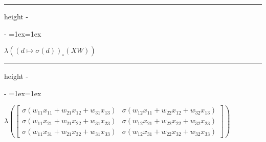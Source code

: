 \documentclass[letterpaper,10pt,english]{sphinxmanual}
\makeatletter
\newenvironment{nbsphinxfancyoutput}{%
    \let\sphinxincludegraphics\nbsphinxincludegraphics
    \nbsphinx@image@maxheight\textheight
    \advance\nbsphinx@image@maxheight -2\fboxsep   %
    \advance\nbsphinx@image@maxheight -2\fboxrule  %
    \advance\nbsphinx@image@maxheight -\baselineskip
\def\nbsphinxfcolorbox{\spx@fcolorbox{nbsphinx-code-border}{white}}%
\def\FrameCommand{\nbsphinxfcolorbox\nbsphinxfancyaddprompt\@empty}%
\def\FirstFrameCommand{\nbsphinxfcolorbox\nbsphinxfancyaddprompt\sphinxVerbatim@Continues}%
\def\MidFrameCommand{\nbsphinxfcolorbox\sphinxVerbatim@Continued\sphinxVerbatim@Continues}%
\def\LastFrameCommand{\nbsphinxfcolorbox\sphinxVerbatim@Continued\@empty}%
\MakeFramed{\advance\hsize-\width\@totalleftmargin\z@\linewidth\hsize\@setminipage}%
\lineskip=1ex\lineskiplimit=1ex\raggedright%
}{\par\unskip\@minipagefalse\endMakeFramed}
\def\nbsphinxfancyaddprompt{\ifvoid\nbsphinxpromptbox\else
    \kern\fboxrule\kern\fboxsep
    \copy\nbsphinxpromptbox
    \kern-\ht\nbsphinxpromptbox\kern-\dp\nbsphinxpromptbox
    \kern-\fboxsep\kern-\fboxrule\nointerlineskip
    \fi}
\newlength\nbsphinxcodecellspacing
\newcommand*{\nbsphinxincludegraphics}[2][]{%
    \gdef\spx@includegraphics@options{#1}%
    \setbox\spx@image@box\hbox{\texttt{[image: \#2]}}%
    \in@false
    \ifdim \wd\spx@image@box>\linewidth
      \g@addto@macro\spx@includegraphics@options{,width=\linewidth}%
      \in@true
    \fi
    \ifdim \ht\spx@image@box>\nbsphinx@image@maxheight
      \g@addto@macro\spx@includegraphics@options{,height=\nbsphinx@image@maxheight}%
      \in@true
    \fi
    \ifin@
      \g@addto@macro\spx@includegraphics@options{,keepaspectratio}%
    \fi
    \setbox\spx@image@box\box\voidb@x %
    \expandafter\includegraphics\expandafter[\spx@includegraphics@options]{#2}%
}%
\makeatother
\begin{document}
{
\begin{sphinxVerbatim}[commandchars=\\\{\}]
\llap{\color{nbsphinxin}[65]:\,\hspace{\fboxrule}\hspace{\fboxsep}}
  
\end{sphinxVerbatim}
}

\hrule height -\fboxrule\relax
\vspace{\nbsphinxcodecellspacing}

\savebox\nbsphinxpromptbox[0pt][r]{\color{nbsphinxout}\Verb|\strut{[65]:}\,|}

\begin{nbsphinxfancyoutput}
$\displaystyle \lambda{\left({\left( d \mapsto \sigma{\left(d \right)} \right)}_{\circ}\left({X W}\right) \right)}$
\end{nbsphinxfancyoutput}

{
\begin{sphinxVerbatim}[commandchars=\\\{\}]
\llap{\color{nbsphinxin}[66]:\,\hspace{\fboxrule}\hspace{\fboxsep}}   
\end{sphinxVerbatim}
}

\hrule height -\fboxrule\relax
\vspace{\nbsphinxcodecellspacing}

\savebox\nbsphinxpromptbox[0pt][r]{\color{nbsphinxout}\Verb|\strut{[66]:}\,|}

\begin{nbsphinxfancyoutput}
$\displaystyle \lambda{\left(\left[\begin{matrix}\sigma{\left(w_{11} x_{11} + w_{21} x_{12} + w_{31} x_{13} \right)} & \sigma{\left(w_{12} x_{11} + w_{22} x_{12} + w_{32} x_{13} \right)}\\\sigma{\left(w_{11} x_{21} + w_{21} x_{22} + w_{31} x_{23} \right)} & \sigma{\left(w_{12} x_{21} + w_{22} x_{22} + w_{32} x_{23} \right)}\\\sigma{\left(w_{11} x_{31} + w_{21} x_{32} + w_{31} x_{33} \right)} & \sigma{\left(w_{12} x_{31} + w_{22} x_{32} + w_{32} x_{33} \right)}\end{matrix}\right] \right)}$
\end{nbsphinxfancyoutput}
\end{document}
